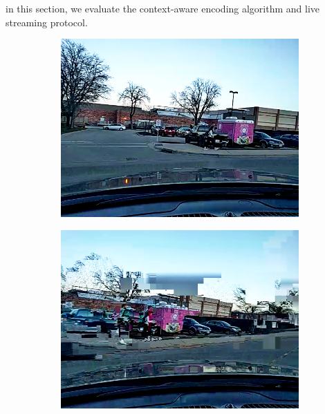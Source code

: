 


in this section, we evaluate the context-aware encoding algorithm
and live streaming protocol. 


\begin{figure}[!t]
  \centering
  \begin{subfigure}[t]{0.25\textwidth}
    \includegraphics[width=\linewidth]{Figs/RTDrive/evaluation/frames/default_0.png}
  \end{subfigure}%
  \begin{subfigure}[t]{0.25\textwidth}
    \includegraphics[width=\linewidth]{Figs/RTDrive/evaluation/frames/default_1.png}
  \end{subfigure}%
  \begin{subfigure}[t]{0.25\textwidth}

\end{subfigure}
\end{figure}
